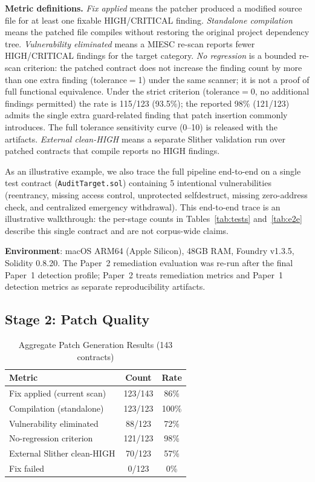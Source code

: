 \documentclass[conference]{IEEEtran}
\begin{document}
\textbf{Metric definitions.} \emph{Fix applied} means the patcher produced a modified source file for at least one fixable HIGH/CRITICAL finding. \emph{Standalone compilation} means the patched file compiles without restoring the original project dependency tree. \emph{Vulnerability eliminated} means a MIESC re-scan reports fewer HIGH/CRITICAL findings for the target category. \emph{No regression} is a bounded re-scan criterion: the patched contract does not increase the finding count by more than one extra finding (tolerance$=$1) under the same scanner; it is not a proof of full functional equivalence. Under the strict criterion (tolerance$=$0, no additional findings permitted) the rate is 115/123 (93.5\%); the reported 98\% (121/123) admits the single extra guard-related finding that patch insertion commonly introduces. The full tolerance sensitivity curve (0--10) is released with the artifacts. \emph{External clean-HIGH} means a separate Slither validation run over patched contracts that compile reports no HIGH findings.

As an illustrative example, we also trace the full pipeline end-to-end on a single test contract (\texttt{AuditTarget.sol}) containing 5 intentional vulnerabilities (reentrancy, missing access control, unprotected selfdestruct, missing zero-address check, and centralized emergency withdrawal). This end-to-end trace is an illustrative walkthrough: the per-stage counts in Tables~\ref{tab:tests} and~\ref{tab:e2e} describe this single contract and are not corpus-wide claims.

\textbf{Environment}: macOS ARM64 (Apple Silicon), 48GB RAM, Foundry v1.3.5, Solidity 0.8.20. The Paper~2 remediation evaluation was re-run after the final Paper~1 detection profile; Paper~2 treats remediation metrics and Paper~1 detection metrics as separate reproducibility artifacts.

\subsection{Stage 2: Patch Quality}

\begin{table}[htbp]
\caption{Aggregate Patch Generation Results (143 contracts)}
\label{tab:fix}
\centering
\begin{tabular}{@{}lcc@{}}
\toprule
\textbf{Metric} & \textbf{Count} & \textbf{Rate} \\
\midrule
Fix applied (current scan) & 123/143 & 86\% \\
Compilation (standalone) & 123/123 & 100\% \\
Vulnerability eliminated & 88/123 & 72\% \\
No-regression criterion & 121/123 & 98\% \\
External Slither clean-HIGH & 70/123 & 57\% \\
Fix failed & 0/123 & 0\% \\
\bottomrule
\end{tabular}
\end{table}
\end{document}
